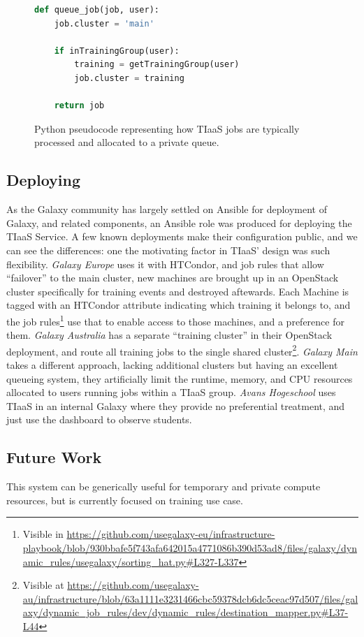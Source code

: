 \documentclass[a4paper,num-refs]{oup-contemporary}
\begin{document}
\begin{figure}[!ht]
\centering
\begin{lstlisting}[frame=single,language=Python]  % Start your code-block
def queue_job(job, user):
    job.cluster = 'main'

    if inTrainingGroup(user):
        training = getTrainingGroup(user)
        job.cluster = training

    return job
\end{lstlisting}
\caption{Python pseudocode representing how TIaaS jobs are typically processed and allocated to a private queue.\label{code:scheduler}}
\end{figure}

\subsection{Deploying}
As the Galaxy community has largely settled on Ansible for deployment of Galaxy, and related components, an Ansible role was produced for deploying the TIaaS Service. A few known deployments make their configuration public, and we can see the differences: one the motivating factor in TIaaS' design was such flexibility. \emph{Galaxy Europe} uses it with HTCondor, and job rules that allow ``failover'' to the main cluster, new machines are brought up in an OpenStack cluster specifically for training events and destroyed aftewards. Each Machine is tagged with an HTCondor attribute indicating which training it belongs to, and the job rules\footnote{Visible in \url{https://github.com/usegalaxy-eu/infrastructure-playbook/blob/930bbafe5f743afa642015a4771086b390d53ad8/files/galaxy/dynamic_rules/usegalaxy/sorting_hat.py#L327-L337}} use that to enable access to those machines, and a preference for them. \emph{Galaxy Australia} has a separate ``training cluster'' in their OpenStack deployment, and route all training jobs to the single shared cluster\footnote{Visible at \url{https://github.com/usegalaxy-au/infrastructure/blob/63a1111e3231466cbc59378dcb6dc5ceac97d507/files/galaxy/dynamic_job_rules/dev/dynamic_rules/destination_mapper.py#L37-L44}}. \emph{Galaxy Main} takes a different approach, lacking additional clusters but having an excellent queueing system, they artificially limit the runtime, memory, and CPU resources allocated to users running jobs within a TIaaS group. \emph{Avans Hogeschool} uses TIaaS in an internal Galaxy where they provide no preferential treatment, and just use the dashboard to observe students.

\subsection{Future Work}
 This system can be generically useful for temporary and private compute resources, but is currently focused on training use case.
\end{document}
